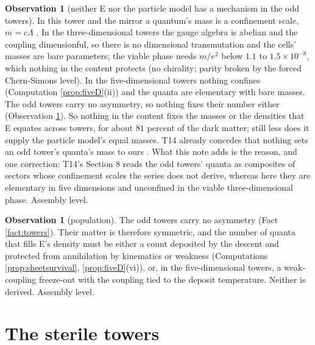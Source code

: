 \documentclass[11pt]{article}
\theoremstyle{definition}
\newtheorem{observation}[theorem]{Observation}
\begin{document}
\begin{observation}[neither E nor the particle model has a mechanism in the odd towers]\label{prop:R1}
In this tower and the mirror a quantum's mass is a confinement scale, $m = c\Lambda$ \cite[Prop.~4.7]{ButlerT14}. In the three-dimensional towers the gauge algebra is abelian and the coupling dimensionful, so there is no dimensional transmutation and the cells' masses are bare parameters; the viable phase needs $m/e^{2}$ below $1.1$ to $1.5 \times 10^{-8}$, which nothing in the content protects (no chirality; parity broken by the forced Chern-Simons level). In the five-dimensional towers nothing confines (Computation \ref{prop:fiveD}(ii)) and the quanta are elementary with bare masses. The odd towers carry no asymmetry, so nothing fixes their number either (Observation \ref{prop:population}). So nothing in the content fixes the masses or the densities that E equates across towers, for about $81$ percent of the dark matter; still less does it supply the particle model's equal masses. T14 already concedes that nothing sets an odd tower's quanta's mass to ours \cite[Rem.~7.8, Sec.~8]{ButlerT14}. What this note adds is the reason, and one correction: T14's Section 8 reads the odd towers' quanta as composites of sectors whose confinement scales the series does not derive, whereas here they are elementary in five dimensions and unconfined in the viable three-dimensional phase. Assembly level.
\end{observation}

\begin{observation}[population]\label{prop:population}
The odd towers carry no asymmetry (Fact \ref{fact:towers}). Their matter is therefore symmetric, and the number of quanta that fills E's density must be either a count deposited by the descent and protected from annihilation by kinematics or weakness (Computations \ref{prop:sheetsurvival}, \ref{prop:fiveD}(vi)), or, in the five-dimensional towers, a weak-coupling freeze-out with the coupling tied to the deposit temperature. Neither is derived. Assembly level.
\end{observation}

\section{The sterile towers}\label{sec:sterile}
\end{document}
